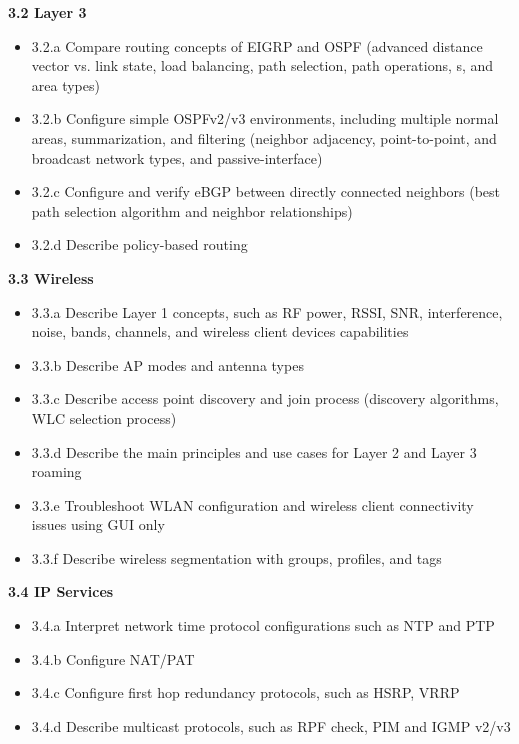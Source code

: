 \documentclass{article}
\begin{document}
\noindent\textbf{3.2 Layer 3}
\begin{itemize}
\item 3.2.a Compare routing concepts of EIGRP and OSPF (advanced distance vector vs. link state, load balancing, path selection, path operations, s, and area types)
\item 3.2.b Configure simple OSPFv2/v3 environments, including multiple normal areas, summarization, and filtering (neighbor adjacency, point-to-point, and broadcast network types, and passive-interface)
\item 3.2.c Configure and verify eBGP between directly connected neighbors (best path selection algorithm and neighbor relationships)
\item 3.2.d Describe policy-based routing
\end{itemize}

\noindent\textbf{3.3 Wireless}
\begin{itemize}
\item 3.3.a Describe Layer 1 concepts, such as RF power, RSSI, SNR, interference, noise, bands, channels, and wireless client devices capabilities
\item 3.3.b Describe AP modes and antenna types
\item 3.3.c Describe access point discovery and join process (discovery algorithms, WLC selection process)
\item 3.3.d Describe the main principles and use cases for Layer 2 and Layer 3 roaming
\item 3.3.e Troubleshoot WLAN configuration and wireless client connectivity issues using GUI only
\item 3.3.f Describe wireless segmentation with groups, profiles, and tags
\end{itemize}


\noindent\textbf{3.4 IP Services}
\begin{itemize}
\item 3.4.a Interpret network time protocol configurations such as NTP and PTP
\item 3.4.b Configure NAT/PAT
\item 3.4.c Configure first hop redundancy protocols, such as HSRP, VRRP
\item 3.4.d Describe multicast protocols, such as RPF check, PIM and IGMP v2/v3
\end{itemize}

\newpage
\end{document}
